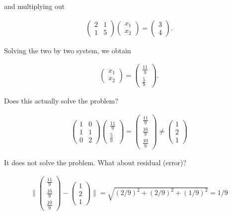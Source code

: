 and multiplying out

\[\begin{aligned}
\begin{pmatrix} 2 & 1 \\ 1 & 5 \end{pmatrix}\begin{pmatrix} x_1 \\ x_2 \end{pmatrix} = \begin{pmatrix} 3 \\ 4 \end{pmatrix} .
\end{aligned}\]

Solving the two by two system, we obtain

\[\begin{aligned}
\begin{pmatrix} x_1 \\ x_2 \end{pmatrix} = \begin{pmatrix} \frac{11}{9} \\[1mm] \frac{5}{9} \end{pmatrix} .
\end{aligned}\]

Does this actually solve the problem?

\[\begin{aligned}
\begin{pmatrix} 1 & 0 \\ 1 & 1 \\ 0 & 2 \end{pmatrix}\begin{pmatrix} \frac{11}{9} \\[1mm] \frac{5}{9} \end{pmatrix} = \begin{pmatrix}  \frac{11}{9} \\[1mm] \frac{16}{9}\\[1mm]  \frac{10}{9} \end{pmatrix} \neq  \begin{pmatrix} 1 \\ 2 \\ 1 \end{pmatrix}
\end{aligned}\]

It does not solve the problem. What about residual (error)?

\[\begin{aligned}
\| \begin{pmatrix}  \frac{11}{9} \\[1mm] \frac{16}{9}\\[1mm]  \frac{10}{9} \end{pmatrix} -  \begin{pmatrix} 1 \\ 2 \\ 1 \end{pmatrix} \| = \sqrt{(2/9)^2 + (2/9)^2 + (1/9)^2} = 1/9
\end{aligned}\]

